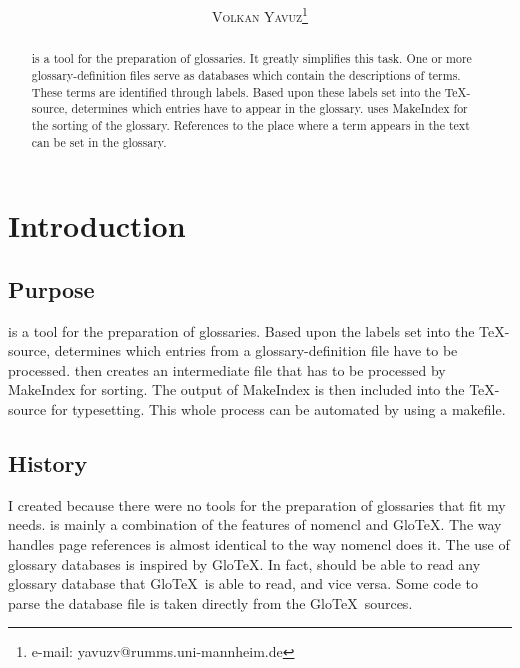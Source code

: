 \documentclass[draft,a4paper]{ltxdoc}
\newcommand{\MakeIndex}{{MakeIndex}}
\newcommand{\GloTeX}{Glo\TeX}
\begin{document}
\title{\GlossTeX{} \fileversion}
\author{\scshape Volkan Yavuz\footnote{e-mail: yavuzv@rumms.uni-mannheim.de}}
\date{\filedate}
\maketitle


\begin{abstract}
  \GlossTeX{} is a tool for the preparation of glossaries. It greatly
  simplifies this task. One or more glossary-definition files serve as
  databases which contain the descriptions of terms. These terms are
  identified through labels. Based upon these labels set into the
  \TeX{}-source, \GlossTeX{} determines which entries have to appear in
  the glossary. \GlossTeX{} uses \MakeIndex{} for the sorting of the
  glossary. References to the place where a term appears in the text
  can be set in the glossary.
\end{abstract}

\tableofcontents
\listoftables


\section{Introduction}
\subsection{Purpose}
\GlossTeX{} is a tool for the preparation of glossaries. Based upon the
labels set into the \TeX{}-source, \GlossTeX{} determines which entries
from a glossary-definition file have to be processed. \GlossTeX{} then
creates an intermediate file that has to be processed by \MakeIndex{} for
sorting. The output of \MakeIndex{}  is then included into the
\TeX{}-source for typesetting. This whole process can be automated by
using a makefile.

\subsection{History}
I created \GlossTeX{} because there were no tools for the preparation
of glossaries that fit my needs. \GlossTeX{} is mainly a combination of
the features of {\sffamily nomencl} and \GloTeX{}. The way \GlossTeX{} 
handles page references is almost identical to the way {\sffamily
  nomencl} does it. The use of glossary databases is inspired by
\GloTeX{}. In fact, \GlossTeX{} should be able to read any glossary
database that \GloTeX\ is able to read, and vice versa. Some code to
parse the database file is taken directly from the \GloTeX\ sources.
\end{document}
